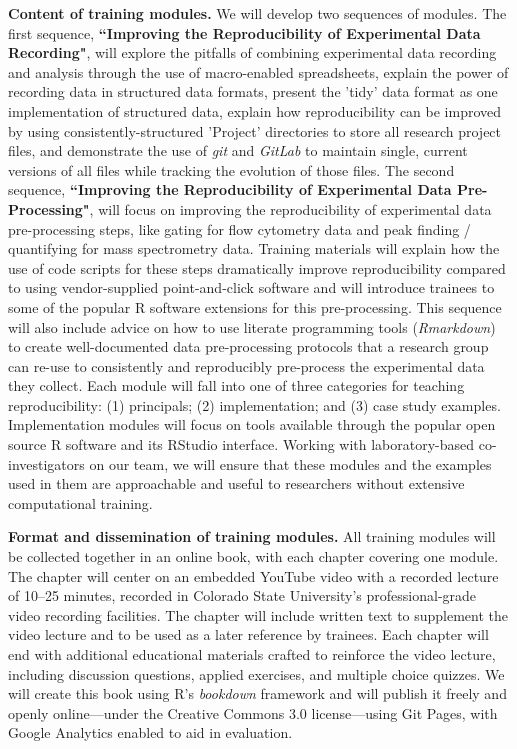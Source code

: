 \documentclass[pdftex,english,11pt,parskip=half]{scrartcl}
\begin{document}
\textbf{Content of training modules.} We will develop two sequences of modules. The first sequence, \textbf{``Improving the Reproducibility of Experimental Data Recording"}, will explore the pitfalls of combining experimental data recording and analysis through the use of macro-enabled spreadsheets, explain the power of recording data in structured data formats, present the 'tidy' data format as one implementation of structured data, explain how reproducibility can be improved by using consistently-structured 'Project' directories to store all research project files, and demonstrate the use of \textit{git} and \textit{GitLab} to maintain single, current versions of all files while tracking the evolution of those files. The second sequence, \textbf{``Improving the Reproducibility of Experimental Data Pre-Processing"}, will focus on improving the reproducibility of experimental data pre-processing steps, like gating for flow cytometry data and peak finding / quantifying for mass spectrometry data. Training materials will explain how the use of code scripts for these steps dramatically improve reproducibility compared to using vendor-supplied point-and-click software and will introduce trainees to some of the popular R software extensions for this pre-processing. This sequence will also include advice on how to use literate programming tools (\textit{Rmarkdown}) to create well-documented data pre-processing protocols that a research group can re-use to consistently and reproducibly pre-process the experimental data they collect. Each module will fall into one of three categories for teaching reproducibility: (1) principals; (2) implementation; and (3) case study examples. Implementation modules will focus on tools available through the popular open source R software and its RStudio interface. Working with laboratory-based co-investigators on our team, we will ensure that these modules and the examples used in them are approachable and useful to researchers without extensive computational training.  

\textbf{Format and dissemination of training modules.} All training modules will be collected together in an online book, with each chapter covering one module. The chapter will center on an embedded YouTube video with a recorded lecture of 10--25 minutes, recorded in Colorado State University's professional-grade video recording facilities. The chapter will include written text to supplement the video lecture and to be used as a later reference by trainees. Each chapter will end with additional educational materials crafted to reinforce the video lecture, including discussion questions, applied exercises, and multiple choice quizzes. We will create this book using R's \textit{bookdown} framework and will publish it freely and openly online---under the Creative Commons 3.0 license---using Git Pages, with Google Analytics enabled to aid in evaluation. 
\end{document}
